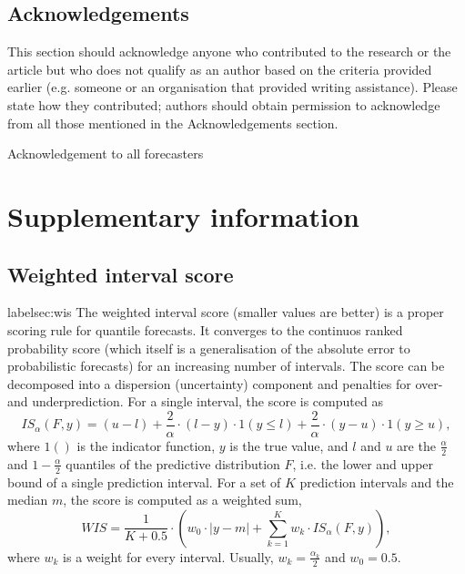 \documentclass[10pt,a4paper,twocolumn]{article}
\begin{document}
\subsection*{Acknowledgements}
This section should acknowledge anyone who contributed to the research or the
article but who does not qualify as an author based on the criteria provided earlier
(e.g. someone or an organisation that provided writing assistance). Please state how
they contributed; authors should obtain permission to acknowledge from all those
mentioned in the Acknowledgements section.

Acknowledgement to all forecasters










\appendix
\section*{Supplementary information}


\subsection*{Weighted interval score}
label{sec:wis}
The weighted interval score (smaller values are better) is a proper scoring rule for quantile forecasts. It converges to the continuos ranked probability score (which itself is a generalisation of the absolute error to probabilistic forecasts) for an increasing number of intervals. The score can be decomposed into a dispersion (uncertainty) component and penalties for over- and underprediction. For a single interval, the score is computed as 
  $$IS_\alpha(F,y) = (u-l) + \frac{2}{\alpha} \cdot (l-y) \cdot 1(y \leq l) + \frac{2}{\alpha} \cdot (y-u) \cdot 1(y \geq u), $$ 
  where $1()$ is the indicator function, $y$ is the true value, and $l$ and $u$ are the $\frac{\alpha}{2}$ and $1 - \frac{\alpha}{2}$ quantiles of the predictive distribution $F$, i.e. the lower and upper bound of a single prediction interval. For a set of $K$ prediction intervals and the median $m$, the score is computed as a weighted sum, 
  $$WIS = \frac{1}{K + 0.5} \cdot \left( w_0 \cdot |y - m| + \sum_{k = 1}^{K} w_k \cdot IS_{\alpha}(F, y) \right), $$
  where $w_k$ is a weight for every interval. Usually, $w_k = \frac{\alpha_k}{2}$ and $w_0 = 0.5$. 
  
\end{document}
